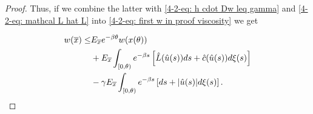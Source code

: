 \begin{theorem}
\begin{proof}
        Thus, if we combine the latter with \eqref{4-2-eq: h cdot Dw leq gamma} and \eqref{4-2-eq: mathcal L hat L} into \eqref{4-2-eq: first w in proof viscosity} we get

        \begin{align*}
            w(\overline{x}) \leq & E_{\overline{x}} e^{-\beta \theta}w(x(\theta)) \\
            & + E_{\overline{x}} \int_{[0,\theta)} e^{-\beta s}\left[\hat{L}(\hat{u}(s))ds + \hat{c}(\hat{u}(s))d\xi(s)\right] \\
            & - \gamma E_{\overline{x}} \int_{[0,\theta)} e^{-\beta s} \left[ds + \abs{\hat{u}(s)}d\xi(s)\right]. 
        \end{align*}


    \end{proof}
\end{theorem}